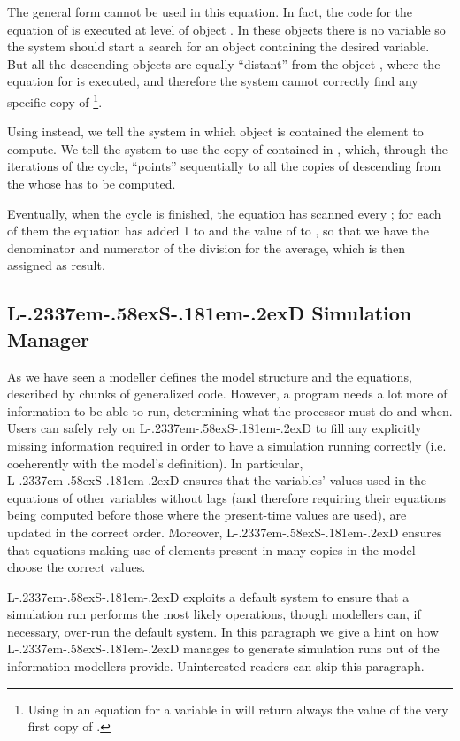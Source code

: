 \documentclass [11pt,a4paper] {book}
\def\LsD{{L\kern-.2337em\lower-.58ex\hbox{S}\kern-.181em\lower-.2ex\hbox{D}}\xspace}
\begin{document}
The general form
 cannot be used in this equation. In fact, the code for the equation of
 is executed at level of object . In these objects
there is no variable  so the system should start a search for an object
containing the desired variable. But all the descending objects  are equally
``distant'' from the object , where the equation for 
is executed, and therefore the system cannot correctly find any specific copy of
\footnote{Using  in an equation for a variable in
 will return always the value of the very first copy of
.}.

Using  instead, we tell the system in which object is contained the
element to compute. We tell the system to use the copy of  contained in
, which, through the iterations of the cycle, ``points'' sequentially to all the copies of
 descending from the  whose  has to be
computed.

Eventually, when the cycle is finished, the equation has scanned every ; for
each of them the equation has added 1 to  and the value of  to
, so that we have the denominator and numerator of the division for the
average, which is then assigned as result.


\subsection{\LsD Simulation Manager}

As we have seen a modeller defines the model structure and the equations, described by chunks of generalized code. However, a program needs a lot more of information to be able to run, determining what the processor must do and when. Users can safely rely on \LsD to fill any explicitly missing information required in order to have a simulation running correctly (i.e. coeherently with the model's definition). In particular, \LsD ensures that the variables' values used in the equations of other variables without lags (and therefore requiring their equations being computed before those where the present-time values are used), are updated in the correct order. Moreover, \LsD ensures that equations making use of elements present in many copies in the model choose the correct values. 

\LsD exploits a default system to ensure that a simulation run performs the most likely operations, though modellers can, if necessary, over-run the default system. In this paragraph we give a hint on how \LsD manages to generate simulation runs out of the information modellers provide. Uninterested readers can skip this paragraph.
\end{document}
